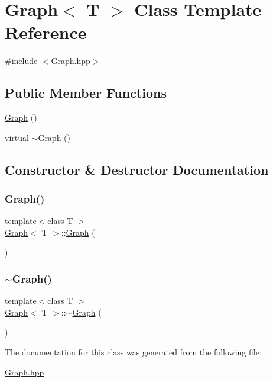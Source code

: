 \hypertarget{class_graph}{}\section{Graph$<$ T $>$ Class Template Reference}
\label{class_graph}


{\ttfamily \#include $<$Graph.\+hpp$>$}

\subsection*{Public Member Functions}
\begin{DoxyCompactItemize}
\item 
\hyperlink{class_graph_a8c626ac04708ae490bba05e1e713cda2}{Graph} ()
\item 
virtual \hyperlink{class_graph_a43eab1460b5c8ceaa526b40e56a0fb0c}{$\sim$\+Graph} ()
\end{DoxyCompactItemize}


\subsection{Constructor \& Destructor Documentation}
\mbox{\label{class_graph_a8c626ac04708ae490bba05e1e713cda2}} 
\subsubsection{\texorpdfstring{Graph()}{Graph()}}
{\footnotesize\ttfamily template$<$class T $>$ \\
\hyperlink{class_graph}{Graph}$<$ T $>$\+::\hyperlink{class_graph}{Graph} (\begin{DoxyParamCaption}{ }\end{DoxyParamCaption})}

\mbox{\label{class_graph_a43eab1460b5c8ceaa526b40e56a0fb0c}} 
\subsubsection{\texorpdfstring{$\sim$\+Graph()}{~Graph()}}
{\footnotesize\ttfamily template$<$class T $>$ \\
\hyperlink{class_graph}{Graph}$<$ T $>$\+::$\sim$\hyperlink{class_graph}{Graph} (\begin{DoxyParamCaption}{ }\end{DoxyParamCaption})\hspace{0.3cm}{\ttfamily [virtual]}}



The documentation for this class was generated from the following file\+:\begin{DoxyCompactItemize}
\item 
\hyperlink{_graph_8hpp}{Graph.\+hpp}\end{DoxyCompactItemize}
